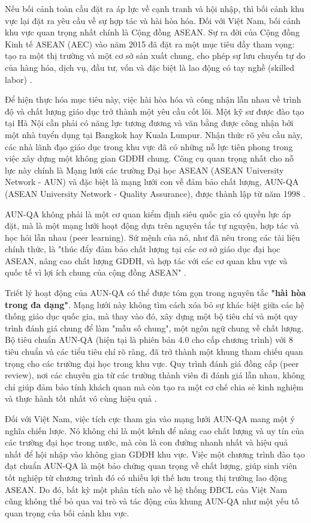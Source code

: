 \documentclass[12pt, a4paper, openany]{report}
\begin{document}
Nếu bối cảnh toàn cầu đặt ra áp lực về cạnh tranh và hội nhập, thì bối cảnh khu vực lại đặt ra yêu cầu về sự hợp tác và hài hòa hóa. Đối với Việt Nam, bối cảnh khu vực quan trọng nhất chính là Cộng đồng ASEAN. Sự ra đời của Cộng đồng Kinh tế ASEAN (AEC) vào năm 2015 đã đặt ra một mục tiêu đầy tham vọng: tạo ra một thị trường và một cơ sở sản xuất chung, cho phép sự lưu chuyển tự do của hàng hóa, dịch vụ, đầu tư, vốn và đặc biệt là lao động có tay nghề (skilled labor) \cite{ASEAN_AEC_Blueprint}.

Để hiện thực hóa mục tiêu này, việc hài hòa hóa và công nhận lẫn nhau về trình độ và chất lượng giáo dục trở thành một yêu cầu cốt lõi. Một kỹ sư được đào tạo tại Hà Nội cần phải có năng lực tương đương và văn bằng được công nhận bởi một nhà tuyển dụng tại Bangkok hay Kuala Lumpur. Nhận thức rõ yêu cầu này, các nhà lãnh đạo giáo dục trong khu vực đã có những nỗ lực tiên phong trong việc xây dựng một không gian GDĐH chung. Công cụ quan trọng nhất cho nỗ lực này chính là Mạng lưới các trường Đại học ASEAN (ASEAN University Network - AUN) và đặc biệt là mạng lưới con về đảm bảo chất lượng, AUN-QA (ASEAN University Network - Quality Assurance), được thành lập từ năm 1998 \cite{AUNQA_History}.

AUN-QA không phải là một cơ quan kiểm định siêu quốc gia có quyền lực áp đặt, mà là một mạng lưới hoạt động dựa trên nguyên tắc tự nguyện, hợp tác và học hỏi lẫn nhau (peer learning). Sứ mệnh của nó, như đã nêu trong các tài liệu chính thức, là "thúc đẩy đảm bảo chất lượng tại các cơ sở giáo dục đại học ASEAN, nâng cao chất lượng GDĐH, và hợp tác với các cơ quan khu vực và quốc tế vì lợi ích chung của cộng đồng ASEAN" \cite{AUN-QAGuide}.

Triết lý hoạt động của AUN-QA có thể được tóm gọn trong nguyên tắc \textbf{"hài hòa trong đa dạng"}. Mạng lưới này không tìm cách xóa bỏ sự khác biệt giữa các hệ thống giáo dục quốc gia, mà thay vào đó, xây dựng một bộ tiêu chí và một quy trình đánh giá chung để làm "mẫu số chung", một ngôn ngữ chung về chất lượng. Bộ tiêu chuẩn AUN-QA (hiện tại là phiên bản 4.0 cho cấp chương trình) với 8 tiêu chuẩn và các tiểu tiêu chí rõ ràng, đã trở thành một khung tham chiếu quan trọng cho các trường đại học trong khu vực. Quy trình đánh giá đồng cấp (peer review), nơi các chuyên gia từ các trường thành viên đi đánh giá lẫn nhau, không chỉ giúp đảm bảo tính khách quan mà còn tạo ra một cơ chế chia sẻ kinh nghiệm và thực hành tốt nhất vô cùng hiệu quả \cite{AUNQA_Report2023}.

Đối với Việt Nam, việc tích cực tham gia vào mạng lưới AUN-QA mang một ý nghĩa chiến lược. Nó không chỉ là một kênh để nâng cao chất lượng và uy tín của các trường đại học trong nước, mà còn là con đường nhanh nhất và hiệu quả nhất để hội nhập vào không gian GDĐH khu vực. Việc một chương trình đào tạo đạt chuẩn AUN-QA là một bảo chứng quan trọng về chất lượng, giúp sinh viên tốt nghiệp từ chương trình đó có nhiều lợi thế hơn trong thị trường lao động ASEAN. Do đó, bất kỳ một phân tích nào về hệ thống ĐBCL của Việt Nam cũng không thể bỏ qua vai trò và tác động của khung AUN-QA như một yếu tố quan trọng của bối cảnh khu vực.
\end{document}
